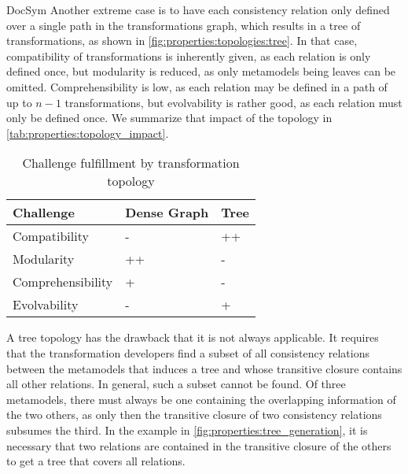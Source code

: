 \begin{copiedFrom}{DocSym}
Another extreme case is to have each consistency relation only defined over a single path in the transformations graph, which results in a tree of transformations, as shown in \autoref{fig:properties:topologies:tree}.
In that case, compatibility of transformations is inherently given, as each relation is only defined once, but modularity is reduced, as only metamodels being leaves can be omitted.
Comprehensibility is low, as each relation may be defined in a path of up to $n-1$ transformations, but evolvability is rather good, as each relation must only be defined once. %
We summarize that impact of the topology in \autoref{tab:properties:topology_impact}.

\begin{table}
    \centering
    \begin{tabular} {L{8em} C{6em} C{5em}}
        \toprule
        \textbf{Challenge} & \textbf{Dense Graph} & \textbf{Tree}\\
        \midrule
        Compatibility & - & ++\\
        Modularity & ++ & -\\
        Comprehensibility & + & -\\
        Evolvability & - & +\\
        \bottomrule
    \end{tabular}
    \caption{Challenge fulfillment by transformation topology}
    \label{tab:properties:topology_impact}
    \vspace{-1.5em}
\end{table}

A tree topology has the drawback that it is not always applicable.
It requires that the transformation developers
find a subset of all consistency relations between the metamodels that induces a tree and whose transitive closure contains all other relations.
In general, such a subset cannot be found.
Of three metamodels, there must always be one containing the overlapping information of the two others, as only then the transitive closure of two consistency relations subsumes the third. 
In the example in \autoref{fig:properties:tree_generation}, it is necessary that two relations are contained in the transitive closure of the others to get a tree that covers all relations.


\end{copiedFrom}
